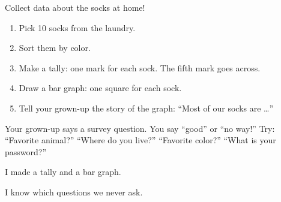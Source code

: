 
\begin{playathome}
Collect data about the socks at home!
\begin{enumerate}[leftmargin=1.4em,itemsep=2pt]
  \item Pick 10 socks from the laundry.
  \item Sort them by color.
  \item Make a tally: one mark for each sock. The fifth mark goes across.
  \item Draw a bar graph: one square for each sock.
  \item Tell your grown-up the story of the graph: \enquote{Most of our socks are \ldots}
\end{enumerate}
\end{playathome}

\begin{playathome}
Your grown-up says a survey question. You say \enquote{good} or \enquote{no way!} Try: \enquote{Favorite animal?} \enquote{Where do you live?} \enquote{Favorite color?} \enquote{What is your password?}
\end{playathome}

\begin{selfcheck}
  \item I made a tally and a bar graph.
  \item I know which questions we never ask.
\end{selfcheck}
